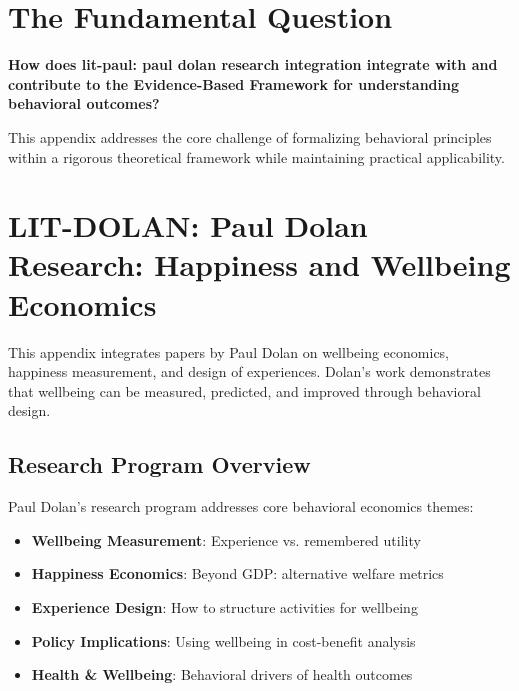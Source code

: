 \section{The Fundamental Question}
\label{sec:dol-fundamental}

\begin{tcolorbox}[
    colback=red!5!white,
    colframe=red!75!black,
    title={\textbf{Fundamental Question}}
]
\textbf{How does lit-paul: paul dolan research integration integrate with and contribute to the
Evidence-Based Framework for understanding behavioral outcomes?}

This appendix addresses the core challenge of formalizing behavioral principles
within a rigorous theoretical framework while maintaining practical applicability.
\end{tcolorbox}




\section{LIT-DOLAN: Paul Dolan Research: Happiness and Wellbeing Economics}
\label{app:litac}

This appendix integrates papers by Paul Dolan on wellbeing economics,
happiness measurement, and design of experiences. Dolan's work demonstrates that
wellbeing can be measured, predicted, and improved through behavioral design.

\subsection{Research Program Overview}

Paul Dolan's research program addresses core behavioral economics themes:

\begin{itemize}
  \item \textbf{Wellbeing Measurement}: Experience vs. remembered utility
  \item \textbf{Happiness Economics}: Beyond GDP: alternative welfare metrics
  \item \textbf{Experience Design}: How to structure activities for wellbeing
  \item \textbf{Policy Implications}: Using wellbeing in cost-benefit analysis
  \item \textbf{Health & Wellbeing}: Behavioral drivers of health outcomes
\end{itemize}

